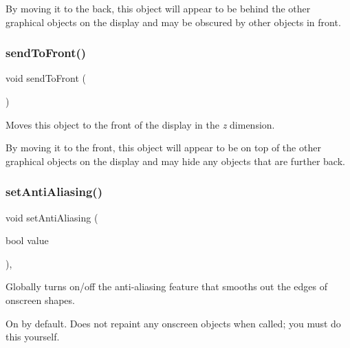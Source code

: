 By moving it to the back, this object will appear to be behind the other graphical objects on the display and may be obscured by other objects in front. \mbox{\label{classGObject_aee33d68488e46827ef55fac07f40a9b2}} 
\subsubsection{\texorpdfstring{send\+To\+Front()}{sendToFront()}}
{\footnotesize\ttfamily void send\+To\+Front (\begin{DoxyParamCaption}{ }\end{DoxyParamCaption})\hspace{0.3cm}{\ttfamily [inherited]}}



Moves this object to the front of the display in the {\itshape z} dimension. 

By moving it to the front, this object will appear to be on top of the other graphical objects on the display and may hide any objects that are further back. \mbox{\label{classGObject_a1e43371668ae850193cebedb44e1bbe3}} 
\subsubsection{\texorpdfstring{set\+Anti\+Aliasing()}{setAntiAliasing()}}
{\footnotesize\ttfamily void set\+Anti\+Aliasing (\begin{DoxyParamCaption}\item[{bool}]{value }\end{DoxyParamCaption})\hspace{0.3cm}{\ttfamily [static]}, {\ttfamily [inherited]}}



Globally turns on/off the anti-\/aliasing feature that smooths out the edges of onscreen shapes. 

On by default. Does not repaint any onscreen objects when called; you must do this yourself. \mbox{\label{classGCompound_adf10848319457bd6df4c657bf8872bee}} 
